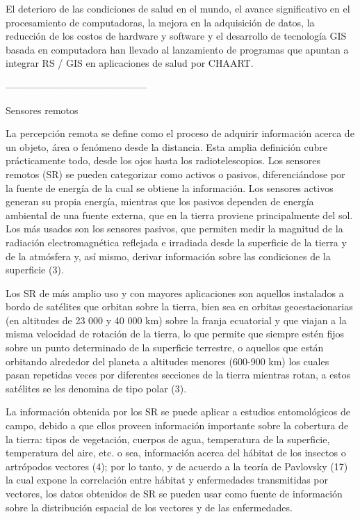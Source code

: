 El deterioro de las condiciones de salud en el mundo, el avance significativo
en el procesamiento de computadoras, la mejora en la
adquisición de datos, la reducción de los costos de hardware y software y el
desarrollo de tecnología GIS basada en computadora han llevado al lanzamiento
de programas que apuntan a integrar RS / GIS en aplicaciones de salud por CHAART.


--------------------------------------------



Sensores remotos

La percepción remota se define como el proceso de adquirir información acerca
de un objeto, área o fenómeno desde la distancia. Esta amplia definición cubre
prácticamente todo, desde los ojos hasta los radiotelescopios. Los sensores
remotos (SR) se pueden categorizar como activos o pasivos, diferenciándose por la fuente
de energía de la cual se obtiene la información.
Los sensores activos generan su propia energía, mientras que los pasivos
dependen de energía ambiental de una fuente externa, que en la tierra
proviene principalmente del sol. Los más usados son los sensores pasivos,
que permiten medir la magnitud de la radiación electromagnética reflejada e
irradiada desde la superficie de la tierra y de la atmósfera y, así mismo,
derivar información sobre las condiciones de la superficie (3).

Los SR de más amplio uso y con mayores aplicaciones son aquellos instalados a
bordo de satélites que orbitan sobre la tierra, bien sea en orbitas geoestacionarias (en
altitudes de 23 000 y 40 000 km) sobre la franja ecuatorial y que viajan a la
misma velocidad de rotación de la tierra, lo que permite que siempre estén
fijos sobre un punto determinado de la superficie terrestre, o aquellos que
están orbitando alrededor del planeta a altitudes menores (600-900 km) los
cuales pasan repetidas veces por diferentes secciones de la tierra mientras
rotan, a estos satélites se les denomina de tipo polar (3).


La información obtenida por los SR se puede aplicar a estudios entomológicos de
campo, debido a que ellos proveen información importante sobre la cobertura de
la tierra: tipos de vegetación, cuerpos de agua, temperatura de la superficie,
temperatura del aire, etc. o sea, información acerca del hábitat de los insectos
o artrópodos vectores (4); por lo tanto, y de acuerdo a la teoría de
Pavlovsky (17) la cual expone la correlación entre hábitat y enfermedades
transmitidas por vectores, los datos obtenidos de SR se pueden usar como
fuente de información sobre la distribución espacial de los vectores y de las
enfermedades.


